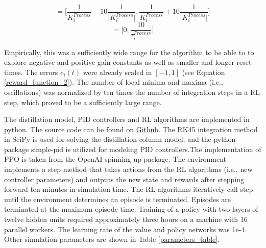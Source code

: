 \begin{equation}
	[K_i^{P, low}, K_i^{P, high}] = \Biggl [\frac{1}{ K_i^{Process}}-10 \frac{1}{\vert K_i^{Process} \vert}, \frac{1}{K_i^{Process}}+10 \frac{1}{\vert K_i^{Process} \vert}\Biggr ]
\end{equation}
\begin{equation}
	[K_i^{I, low}, K_i^{I, high}] = \Biggl [0, \frac{10}{ \tau_i^{Process}}\Biggr ]
\end{equation}

 Empirically, this was a sufficiently wide range for the algorithm to be able to to explore negative and positive gain constants as well as smaller and longer reset times. The errors $e_i(t)$ were already scaled in  $[-1, 1]$ (see Equation \ref{reward_function_2}). The number of local minima and maxima (i.e., oscillations) was normalized by ten times the number of integration steps in a RL step, which proved to be a sufficiently large range. 
 
The distillation model, PID controllers and RL algorithms are implemented in python. The source code can be found on \href{https://github.com/sustainable-processes/distillation_control}{Github}. The RK45 integration method in SciPy is used for solving the distillation column model,\cite{2020SciPy-NMeth} and the python package simple-pid is utilized for modeling PID controllers.\cite{Lundberg2019}The implementation of PPO is taken from the OpenAI spinning up package. The environment implements a step method that takes actions from the RL algorithms (i.e., new controller parameters) and outputs the new state and rewards after stepping forward ten minutes in simulation time. The RL algorithms iteratively call step until the environment determines an episode is terminated. Episodes are terminated at the maximum episode time. Training of a policy with two layers of twelve hidden units required approximately three hours on a machine with 16 parallel workers. The learning rate of the value and policy networks was 1e-4. Other simulation parameters are shown in Table \ref{parameters_table}.

